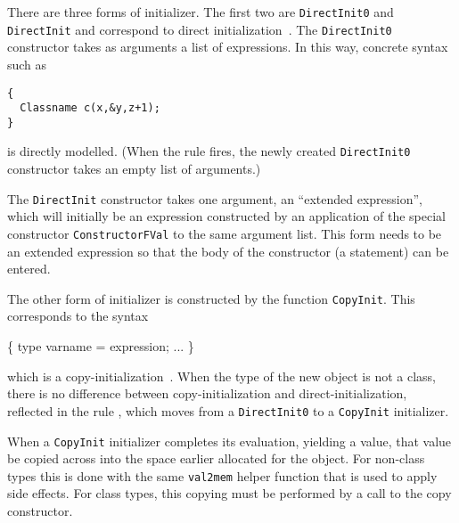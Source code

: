 \documentclass[11pt]{article}
\begin{document}
There are three forms of initializer.  The first two are
\texttt{DirectInit0} and \texttt{DirectInit} and correspond to direct
initialization~\cite[\S 8.5 paragraph 12]{cpp-standard-iso14882}.  The
\texttt{DirectInit0} constructor takes as arguments a list of
expressions.  In this way, concrete syntax such as
\begin{verbatim}
{
  Classname c(x,&y,z+1);
}
\end{verbatim}
is directly modelled.  (When the rule  fires,
the newly created \texttt{DirectInit0} constructor takes an empty list
of arguments.)

The \texttt{DirectInit} constructor takes one argument, an ``extended
expression'', which will initially be an expression constructed by an
application of the special constructor \texttt{ConstructorFVal}%
to the same argument list.  This form needs to be an extended
expression so that the body of the constructor (a statement) can be
entered.

The other form of initializer is constructed by the function
\texttt{CopyInit}.  This corresponds to the syntax
\begin{stdrule}
\{
  type varname = expression;
  ...
\}
\end{stdrule}
which is a
copy-initialization~\cite[\emph{ibid}]{cpp-standard-iso14882}.  When
the type of the new object is not a class, there is no difference
between copy-initialization and direct-initialization, reflected in
the rule , which
moves from a \texttt{DirectInit0} to a \texttt{CopyInit} initializer.

When a \texttt{CopyInit} initializer completes its evaluation,
yielding a value, that value be copied across into the space earlier
allocated for the object.  For non-class types this is done with the
same \texttt{val2mem} helper function that is used to apply side
effects.  For class types, this copying must be performed by a call to
the copy constructor.
\end{document}
